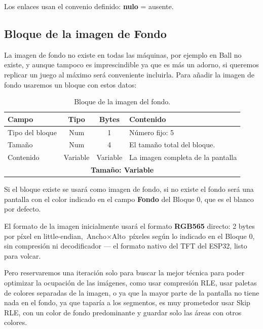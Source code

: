 Los enlaces usan el convenio definido: \textbf{nulo} = ausente.

\subsection{Bloque de la imagen de Fondo}
\label{sec:A02GWCFondo}

La imagen de fondo no existe en todas las máquinas, por ejemplo en Ball no existe, y aunque tampoco es imprescindible ya que es más un adorno, si queremos replicar un juego al máximo será conveniente incluirla. Para añadir la imagen de fondo usaremos un bloque con estos datos:

\begin{table}[H]
	\centering
	\begin{tabular}{|l|c|c|p{8.4cm}|}
		\hline
		\textbf{Campo} & \textbf{Tipo} & \textbf{Bytes} & \textbf{Contenido} \\
		\hline
		
		Tipo del bloque & Num & 1 & Número fijo: 5 \\ \hline
		
		Tamaño & Num & 4 & El tamaño total del bloque. \\ \hline
		
		Contenido & Variable & Variable & La imagen completa de la pantalla \\
		
		\hline\hline
		\multicolumn{4}{c}{\textbf{Tamaño: Variable}} \\ \hline
	\end{tabular}
	\caption{Bloque de la imagen del fondo.}
\end{table}

Si el bloque existe se usará como imagen de fondo, si no existe el fondo será una pantalla con el color indicado en el campo \textbf{Fondo} del Bloque 0, que es el blanco por defecto.

El formato de la imagen inicialmente usará el formato \textbf{RGB565} directo: 2 bytes por píxel en little-endian, $\text{Ancho} \times \text{Alto}$ píxeles según lo indicado en el Bloque 0, sin compresión ni decodificador — el formato nativo del TFT del ESP32, listo para volcar.

Pero reservaremos una iteración solo para buscar la mejor técnica para poder optimizar la ocupación de las imágenes, como usar compresión RLE, usar paletas de colores separadas de la imagen, o ya que la mayor parte de la pantalla no tiene nada en el fondo, ya que taparía a los segmentos, es muy prometedor usar Skip RLE, con un color de fondo predominante y guardar solo las áreas con otros colores.
